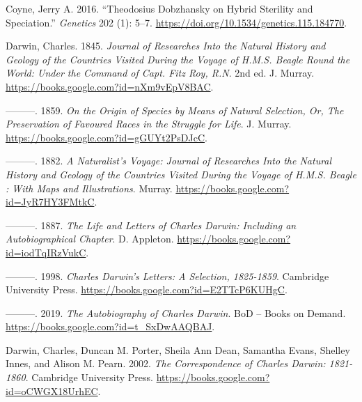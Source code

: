 \documentclass[
]{book}
\newlength{\cslhangindent}
\newlength{\cslentryspacingunit} %
\newenvironment{CSLReferences}[2] %
 {%
  \setlength{\parindent}{0pt}
  \ifodd #1
  \let\oldpar\par
  \def\par{\hangindent=\cslhangindent\oldpar}
  \fi
  \setlength{\parskip}{#2\cslentryspacingunit}
 }%
 {}
\begin{document}
\begin{CSLReferences}{1}{0}
\leavevmode{}%
Coyne, Jerry A. 2016. {``Theodosius {Dobzhansky} on {Hybrid Sterility} and {Speciation}.''} \emph{Genetics} 202 (1): 5--7. \url{https://doi.org/10.1534/genetics.115.184770}.

\leavevmode{}%
Darwin, Charles. 1845. \emph{Journal of {Researches Into} the {Natural History} and {Geology} of the {Countries Visited During} the {Voyage} of {H}.{M}.{S}. {Beagle Round} the {World}: {Under} the {Command} of {Capt}. {Fitz Roy}, {R}.{N}}. 2nd ed. {J. Murray}. \url{https://books.google.com?id=nXm9vEpV8BAC}.

\leavevmode{}%
---------. 1859. \emph{On the {Origin} of {Species} by {Means} of {Natural Selection}, {Or}, {The Preservation} of {Favoured Races} in the {Struggle} for {Life}}. {J. Murray}. \url{https://books.google.com?id=gGUYt2PsDJcC}.

\leavevmode{}%
---------. 1882. \emph{A {Naturalist}'s {Voyage}: {Journal} of {Researches Into} the {Natural History} and {Geology} of the {Countries Visited During} the {Voyage} of {H}.{M}.{S}. {Beagle} : With {Maps} and {Illustrations}}. {Murray}. \url{https://books.google.com?id=JyR7HY3FMtkC}.

\leavevmode{}%
---------. 1887. \emph{The {Life} and {Letters} of {Charles Darwin}: {Including} an {Autobiographical Chapter}}. {D. Appleton}. \url{https://books.google.com?id=iodTqIRzVukC}.

\leavevmode{}%
---------. 1998. \emph{Charles {Darwin}'s {Letters}: {A Selection}, 1825-1859}. {Cambridge University Press}. \url{https://books.google.com?id=E2TTcP6KUHgC}.

\leavevmode{}%
---------. 2019. \emph{The {Autobiography} of {Charles Darwin}}. {BoD -- Books on Demand}. \url{https://books.google.com?id=t_SxDwAAQBAJ}.

\leavevmode{}%
Darwin, Charles, Duncan M. Porter, Sheila Ann Dean, Samantha Evans, Shelley Innes, and Alison M. Pearn. 2002. \emph{The {Correspondence} of {Charles Darwin}: 1821-1860}. {Cambridge University Press}. \url{https://books.google.com?id=oCWGX18UrhEC}.


\end{CSLReferences}
\end{document}
